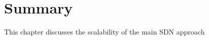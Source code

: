 
\section{Summary} \label{sec:modeling:summary}

This chapter discusses the scalability of the main SDN approach 



